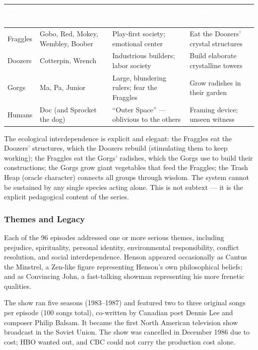 \documentclass[11pt,letterpaper]{article}
\newcommand{\tableheader}[1]{\textbf{\sffamily\textcolor{white}{#1}}}
\begin{document}
\begin{center}
\begin{tabularx}{\textwidth}{L{2.5cm}L{3cm}L{2.5cm}X}
\toprule
{}
\tableheader{Species} & \tableheader{Key Characters} & \tableheader{Allegorical Role} & \tableheader{Ecological Function} \\
\midrule
Fraggles & Gobo, Red, Mokey, Wembley, Boober & Play-first society; emotional center & Eat the Doozers' crystal structures \\
Doozers & Cotterpin, Wrench & Industrious builders; labor society & Build elaborate crystalline towers \\
Gorgs & Ma, Pa, Junior & Large, blundering rulers; fear the Fraggles & Grow radishes in their garden \\
Humans & Doc (and Sprocket the dog) & ``Outer Space'' --- oblivious to the others & Framing device; unseen witness \\
\bottomrule
\end{tabularx}
\end{center}

The ecological interdependence is explicit and elegant: the Fraggles eat the Doozers' structures, which the Doozers rebuild (stimulating them to keep working); the Fraggles eat the Gorgs' radishes, which the Gorgs use to build their constructions; the Gorgs grow giant vegetables that feed the Fraggles; the Trash Heap (oracle character) connects all groups through wisdom. The system cannot be sustained by any single species acting alone. This is not subtext --- it is the explicit pedagogical content of the series.

\subsubsection{Themes and Legacy}

Each of the 96 episodes addressed one or more serious themes, including prejudice, spirituality, personal identity, environmental responsibility, conflict resolution, and social interdependence. Henson appeared occasionally as Cantus the Minstrel, a Zen-like figure representing Henson's own philosophical beliefs; and as Convincing John, a fast-talking showman representing his more frenetic qualities.

The show ran five seasons (1983--1987) and featured two to three original songs per episode (100 songs total), co-written by Canadian poet Dennis Lee and composer Philip Balsam. It became the first North American television show broadcast in the Soviet Union. The show was cancelled in December 1986 due to cost; HBO wanted out, and CBC could not carry the production cost alone.
\end{document}
